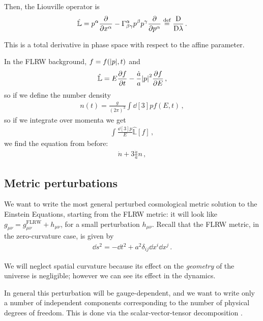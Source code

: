 \documentclass[main.tex]{subfiles}
\begin{document}
Then, the Liouville operator is 
%
\begin{align}
\hat{\mathbb{L}} = p^{\alpha } \pdv{}{x^{\alpha }}-  
\Gamma^{\alpha }_{\beta \gamma } p^{\beta } p^{\gamma } \pdv{}{p^{\alpha }} \overset{\text{def}}{=} \frac{\mathrm{D}}{\mathrm{D}\lambda }
\,.
\end{align}

This is a total derivative in phase space with respect to the affine parameter. 

In the FLRW background, \(f = f(\abs{p}, t)\) and 
%
\begin{align}
\hat{\mathbb{L}} = E \pdv{f}{t} - \frac{\dot{a}}{a} \abs{p}^2 \pdv{f}{E}
\,,
\end{align}
%
so if we define the number density 
%
\begin{align}
n(t) = \frac{g}{(2\pi )^3} \int \dd[3]{p} f(E, t)
\,,
\end{align}
%
so if we integrate over momenta we get 
%
\begin{align}
\int \frac{ \dd[3]{p}}{E} \hat{\mathbb{L}}[f] 
\,,
\end{align}
%
we find the equation from before: 
%
\begin{align}
\dot{n} + 3 \frac{\dot{a}}{a} n 
\,,
\end{align}
%

\subsection{Metric perturbations}

We want to write the most general perturbed cosmological metric solution to the Einstein Equations, starting from the FLRW metric: it will look like \(g_{\mu \nu } = g_{\mu \nu }^{\text{FLRW}} + h_{\mu \nu }\), for a small perturbation \(h_{\mu \nu }\).
Recall that the FLRW metric, in the zero-curvature case, is given by 
%
\begin{align}
\dd{s^2} =  - \dd{t^2} + a^2 \delta_{ij} \dd{x^{i}} \dd{x^{j}}
\,.
\end{align}
%

We will neglect spatial curvature because its effect on the \emph{geometry} of the universe is negligible; however we can see its effect in the dynamics.

In general this perturbation will be gauge-dependent, and we want to write only a number of independent components corresponding to the number of physical degrees of freedom. This is done via the scalar-vector-tensor decomposition \cite[section 2.1]{bertschingerCosmologicalPerturbationTheory2000a}.
\end{document}

